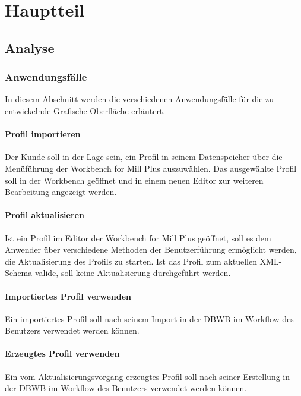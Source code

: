 
\chapter{Hauptteil}
\label{cha:Hauptteil}

\section{Analyse}{
\subsection{Anwendungsfälle}{
In diesem Abschnitt werden die verschiedenen Anwendungsfälle für die zu entwickelnde Grafische Oberfläche erläutert.

\subsubsection{Profil importieren}{
Der Kunde soll in der Lage sein, ein Profil in seinem Datenspeicher über die Menüführung der Workbench for Mill Plus auszuwählen. Das ausgewählte Profil soll in der Workbench geöffnet und in einem neuen Editor zur weiteren Bearbeitung angezeigt werden.
}

\subsubsection{Profil aktualisieren}{
Ist ein Profil im Editor der Workbench for Mill Plus geöffnet, soll es dem Anwender über verschiedene Methoden der Benutzerführung ermöglicht werden, die Aktualisierung des Profils zu starten. Ist das Profil zum aktuellen XML-Schema valide, soll keine Aktualisierung durchgeführt werden.
}

\subsubsection{Importiertes Profil verwenden}{
Ein importiertes Profil soll nach seinem Import in der \ac{DBWB} im Workflow des Benutzers verwendet werden können. 
}

\subsubsection{Erzeugtes Profil verwenden}{
Ein vom Aktualisierungsvorgang erzeugtes Profil soll nach seiner Erstellung in der \ac{DBWB} im Workflow des Benutzers verwendet werden können. 
}



}}
